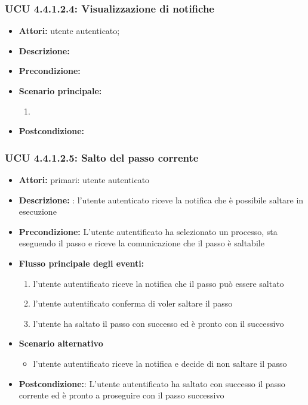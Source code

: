 \subsubsection{UCU 4.4.1.2.4: Visualizzazione di notifiche}
\begin{itemize}
\item \textbf{Attori:} utente autenticato;
\item \textbf{Descrizione:}
\item \textbf{Precondizione:}
\item \textbf{Scenario principale:}
\begin{enumerate}
\item
\end{enumerate}
\item \textbf{Postcondizione:}
\end{itemize}

\subsubsection{UCU 4.4.1.2.5: Salto del passo corrente} %
\begin{itemize}
	\item \textbf{Attori: } primari: utente autenticato
	\item \textbf{Descrizione: }: l'utente autenticato riceve la notifica che è possibile saltare in esecuzione
	\item \textbf{Precondizione:} L'utente autentificato ha selezionato un processo, sta eseguendo il passo e riceve la comunicazione che il passo è saltabile
	\item \textbf{Flusso principale degli eventi:}
	\begin{enumerate}
		\item l'utente autentificato riceve la notifica che il passo può essere saltato
		\item l'utente autentificato conferma di voler saltare il passo
		\item l'utente ha saltato il passo con successo ed è pronto con il successivo
	\end{enumerate}
	\item \textbf{Scenario alternativo}
	\begin{itemize}
		\item l'utente autentificato riceve la notifica e decide di non saltare il passo
	\end{itemize}
	\item \textbf{Postcondizione:}: L'utente autentificato ha saltato con successo il passo corrente ed è pronto a proseguire con il passo successivo
\end{itemize}

